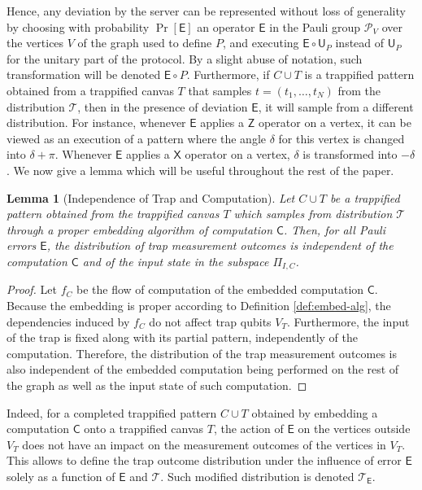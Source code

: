 \documentclass[12pt]{iopart}
\newcommand{\cptp}[1]{\mathsf{#1}} \newcommand{\pd}[1]{\mathcal{#1}}  \newcommand{\sch}[1]{\bm{#1}}
\newcommand{\X}{\cptp{X}}
\newcommand{\Z}{\cptp{Z}}
\renewcommand{\1}{\mathds{1}}
\newcommand{\TP}{C\cup T}
\newtheorem{lemma}{Lemma}
\begin{document}
Hence, any deviation by the server can be represented without loss of generality by choosing with probability $\Pr[\cptp E]$ an operator $\cptp E$ in the Pauli group $\mathcal P_V$ over the vertices $V$ of the graph used to define $P$, and executing $\cptp E \circ \cptp U_P$ instead of $\cptp U_P$ for the unitary part of the protocol.
By a slight abuse of notation, such transformation will be denoted $\cptp E\circ P$.
Furthermore, if $\TP$ is a trappified pattern obtained from a trappified canvas $T$ that samples $t = (t_1, \ldots, t_N)$ from the distribution $\pd T$, then in the presence of deviation $\cptp E$, it will sample from a different distribution.
For instance, whenever $\cptp E$ applies a $\Z$ operator on a vertex, it can be viewed as an execution of a pattern where the angle $\delta$ for this vertex is changed into $\delta + \pi$. Whenever $\cptp E$ applies a $\X$ operator on a vertex, $\delta$ is transformed into $-\delta$.
We now give a lemma which will be useful throughout the rest of the paper.
\begin{lemma}[Independence of Trap and Computation]
\label{lem:indep-t}
Let $\TP$ be a trappified pattern obtained from the trappified canvas $T$ which samples from distribution $\pd T$ through a proper embedding algorithm of computation $\cptp C$. Then, for all Pauli errors $\cptp E$, the distribution of trap measurement outcomes is independent of the computation $\cptp C$ and of the input state in the subspace $\Pi_{I, C}$.
\end{lemma}
\begin{proof}
Let $f_C$ be the flow of computation of the embedded computation $\cptp C$. Because the embedding is proper according to Definition \ref{def:embed-alg}, the dependencies induced by $f_C$ do not affect trap qubits $V_T$. Furthermore, the input of the trap is fixed along with its partial pattern, independently of the computation. Therefore, the distribution of the trap measurement outcomes is also independent of the embedded computation being performed on the rest of the graph as well as the input state of such computation.
\end{proof}
Indeed, for a completed trappified pattern $\TP$ obtained by embedding a computation $\cptp C$ onto a trappified canvas $T$, the action of $\cptp E$ on the vertices outside $V_T$ does not have an impact on the measurement outcomes of the vertices in $V_T$. This allows to define the trap outcome distribution under the influence of error $\cptp E$ solely as a function of $\cptp E$ and $\pd{T}$. Such modified distribution is denoted $\pd T_{\cptp E}$.
\end{document}
